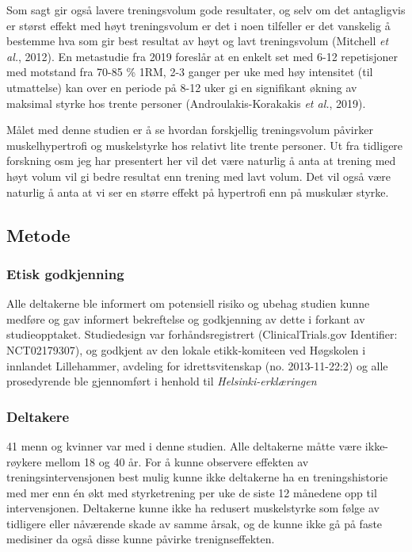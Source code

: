 \documentclass[
  letterpaper,
  DIV=11,
  numbers=noendperiod]{scrreprt}
\begin{document}
Som sagt gir også lavere treningsvolum gode resultater, og selv om det
antagligvis er størst effekt med høyt treningsvolum er det i noen
tilfeller er det vanskelig å bestemme hva som gir best resultat av høyt
og lavt treningsvolum (Mitchell \emph{et al.}, 2012). En metastudie fra
2019 foreslår at en enkelt set med 6-12 repetisjoner med motstand fra
70-85 \% 1RM, 2-3 ganger per uke med høy intensitet (til utmattelse) kan
over en periode på 8-12 uker gi en signifikant økning av maksimal styrke
hos trente personer (Androulakis-Korakakis \emph{et al.}, 2019).

Målet med denne studien er å se hvordan forskjellig treningsvolum
påvirker muskelhypertrofi og muskelstyrke hos relativt lite trente
personer. Ut fra tidligere forskning osm jeg har presentert her vil det
være naturlig å anta at trening med høyt volum vil gi bedre resultat enn
trening med lavt volum. Det vil også være naturlig å anta at vi ser en
større effekt på hypertrofi enn på muskulær styrke.

\subsection{Metode}\label{metode-4}

\subsubsection{Etisk godkjenning}\label{etisk-godkjenning}

Alle deltakerne ble informert om potensiell risiko og ubehag studien
kunne medføre og gav informert bekreftelse og godkjenning av dette i
forkant av studieopptaket. Studiedesign var forhåndsregistrert
(ClinicalTrials.gov Identifier: NCT02179307), og godkjent av den lokale
etikk-komiteen ved Høgskolen i innlandet Lillehammer, avdeling for
idrettsvitenskap (no. 2013-11-22:2) og alle prosedyrende ble gjennomført
i henhold til \emph{Helsinki-erklæringen}

\subsubsection{Deltakere}\label{deltakere}

41 menn og kvinner var med i denne studien. Alle deltakerne måtte være
ikke-røykere mellom 18 og 40 år. For å kunne observere effekten av
treningsintervensjonen best mulig kunne ikke deltakerne ha en
treningshistorie med mer enn én økt med styrketrening per uke de siste
12 månedene opp til intervensjonen. Deltakerne kunne ikke ha redusert
muskelstyrke som følge av tidligere eller nåværende skade av samme
årsak, og de kunne ikke gå på faste medisiner da også disse kunne
påvirke trenignseffekten.
\end{document}
